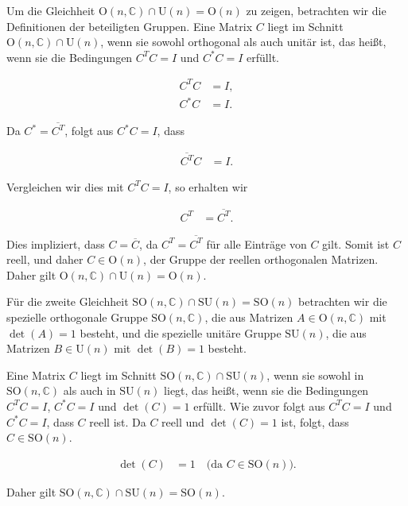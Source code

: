 Um die Gleichheit $\mathrm{O}(n, \mathbb{C}) \cap \mathrm{U}(n) = \mathrm{O}(n)$ zu zeigen, betrachten wir die Definitionen der beteiligten Gruppen. Eine Matrix $C$ liegt im Schnitt $\mathrm{O}(n, \mathbb{C}) \cap \mathrm{U}(n)$, wenn sie sowohl orthogonal als auch unitär ist, das heißt, wenn sie die Bedingungen $C^T C = I$ und $C^* C = I$ erfüllt. 

\begin{align*}
C^T C &= I, \\
C^* C &= I.
\end{align*}

Da $C^* = \overline{C^T}$, folgt aus $C^* C = I$, dass

\begin{align*}
\overline{C^T} C &= I.
\end{align*}

Vergleichen wir dies mit $C^T C = I$, so erhalten wir

\begin{align*}
C^T &= \overline{C^T}.
\end{align*}

Dies impliziert, dass $C = \overline{C}$, da $C^T = \overline{C^T}$ für alle Einträge von $C$ gilt. Somit ist $C$ reell, und daher $C \in \mathrm{O}(n)$, der Gruppe der reellen orthogonalen Matrizen. Daher gilt $\mathrm{O}(n, \mathbb{C}) \cap \mathrm{U}(n) = \mathrm{O}(n)$.

Für die zweite Gleichheit $\mathrm{SO}(n, \mathbb{C}) \cap \mathrm{SU}(n) = \mathrm{SO}(n)$ betrachten wir die spezielle orthogonale Gruppe $\mathrm{SO}(n, \mathbb{C})$, die aus Matrizen $A \in \mathrm{O}(n, \mathbb{C})$ mit $\det(A) = 1$ besteht, und die spezielle unitäre Gruppe $\mathrm{SU}(n)$, die aus Matrizen $B \in \mathrm{U}(n)$ mit $\det(B) = 1$ besteht.

Eine Matrix $C$ liegt im Schnitt $\mathrm{SO}(n, \mathbb{C}) \cap \mathrm{SU}(n)$, wenn sie sowohl in $\mathrm{SO}(n, \mathbb{C})$ als auch in $\mathrm{SU}(n)$ liegt, das heißt, wenn sie die Bedingungen $C^T C = I$, $C^* C = I$ und $\det(C) = 1$ erfüllt. Wie zuvor folgt aus $C^T C = I$ und $C^* C = I$, dass $C$ reell ist. Da $C$ reell und $\det(C) = 1$ ist, folgt, dass $C \in \mathrm{SO}(n)$.

\begin{align*}
\det(C) &= 1 \quad \text{(da $C \in \mathrm{SO}(n)$)}.
\end{align*}

Daher gilt $\mathrm{SO}(n, \mathbb{C}) \cap \mathrm{SU}(n) = \mathrm{SO}(n)$.

